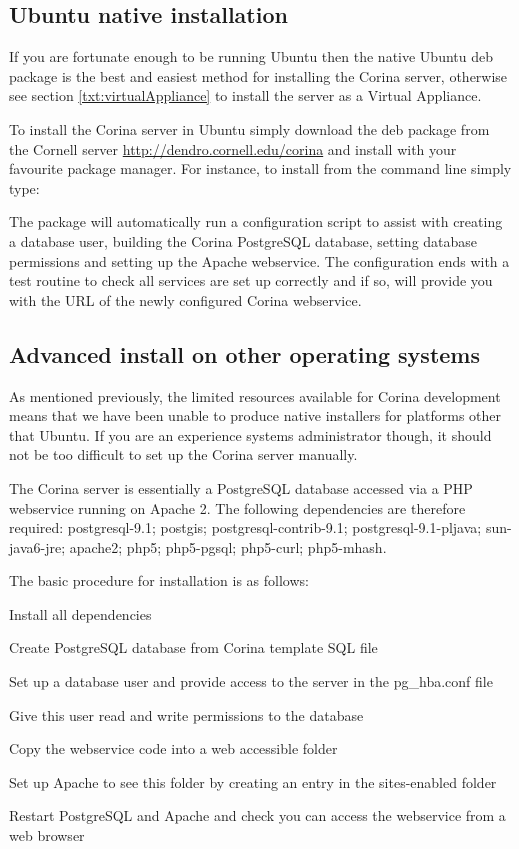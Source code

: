 \subsection{Ubuntu native installation}
\label{txt:installnativeserver}
If you are fortunate enough to be running Ubuntu then the native Ubuntu deb package is the best and easiest method for installing the Corina server, otherwise see section \ref{txt:virtualAppliance} to install the server as a Virtual Appliance.  

To install the Corina server in Ubuntu simply download the deb package from the Cornell server \url{http://dendro.cornell.edu/corina} and install with your favourite package manager.  For instance, to install from the command line simply type:  

The package will automatically run a configuration script to assist with creating a database user, building the Corina PostgreSQL database, setting database permissions and setting up the Apache webservice.  The configuration ends with a test routine to check all services are set up correctly and if so, will provide you with the URL of the newly configured Corina webservice.

\subsection{Advanced install on other operating systems}
\label{txt:installadvancedserver}
As mentioned previously, the limited resources available for Corina development means that we have been unable to produce native installers for platforms other that Ubuntu.  If you are an experience systems administrator though, it should not be too difficult to set up the Corina server manually.  

The Corina server is essentially a PostgreSQL database accessed via a PHP webservice running on Apache 2.  The following dependencies are therefore required: postgresql-9.1; postgis; postgresql-contrib-9.1; postgresql-9.1-pljava; sun-java6-jre; apache2; php5; php5-pgsql; php5-curl; php5-mhash.

The basic procedure for installation is as follows:

\begin{itemize*}
 \item Install all dependencies
 \item Create PostgreSQL database from Corina template SQL file
 \item Set up a database user and provide access to the server in the pg\_hba.conf file
 \item Give this user read and write permissions to the database
 \item Copy the webservice code into a web accessible folder
 \item Set up Apache to see this folder by creating an entry in the sites-enabled folder
 \item Restart PostgreSQL and Apache and check you can access the webservice from a web browser
\end{itemize*}




